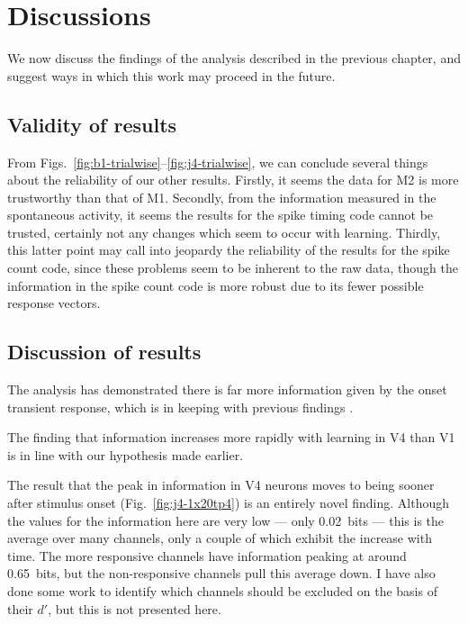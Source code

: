 \section{Discussions}

We now discuss the findings of the analysis described in the previous chapter, and suggest ways in which this work may proceed in the future.

\subsection{Validity of results}

From Figs.~\ref{fig:b1-trialwise}--\ref{fig:j4-trialwise}, we can conclude several things about the reliability of our other results.
Firstly, it seems the data for \ac{M2} is more trustworthy than that of \ac{M1}.
Secondly, from the information measured in the spontaneous activity, it seems the results for the spike timing code cannot be trusted, certainly not any changes which seem to occur with learning.
Thirdly, this latter point may call into jeopardy the reliability of the results for the spike count code, since these problems seem to be inherent to the raw data, though the information in the spike count code is more robust due to its fewer possible response vectors.

\subsection{Discussion of results}

The analysis has demonstrated there is far more information given by the onset transient response, which is in keeping with previous findings \citep{Muller2001}.

The finding that information increases more rapidly with learning in \ac{V4} than \ac{V1} is in line with our hypothesis made earlier.

The result that the peak in information in \ac{V4} neurons moves to being sooner after stimulus onset (Fig.~\ref{fig:j4-1x20tp4}) is an entirely novel finding.
Although the values for the information here are very low --- only \SI{0.02}{bits} --- this is the average over many channels, only a couple of which exhibit the increase with time.
The more responsive channels have information peaking at around \SI{0.65}{bits}, but the non-responsive channels pull this average down.
I have also done some work to identify which channels should be excluded on the basis of their $d'$, but this is not presented here.

